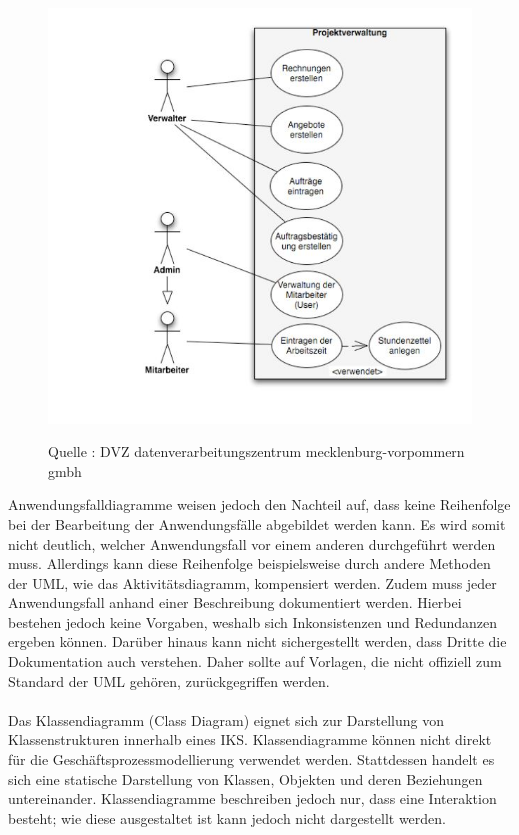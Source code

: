 \begin{center}
\begin{figure}[h]
   

\includegraphics[scale=0.8]{Graphics/Anwendungsdiagram.jpg} 



Quelle : DVZ datenverarbeitungszentrum mecklenburg-vorpommern gmbh

\label{fig2}


\end{figure}
\end{center}
\newpage
Anwendungsfalldiagramme weisen jedoch den Nachteil auf, dass keine Reihenfolge bei der Bearbeitung der Anwendungsfälle abgebildet werden kann. Es wird somit nicht deutlich, welcher Anwendungsfall vor einem anderen durchgeführt werden muss. Allerdings kann diese Reihenfolge beispielsweise durch andere Methoden der UML, wie das Aktivitätsdiagramm, kompensiert werden. Zudem muss jeder Anwendungsfall anhand einer Beschreibung dokumentiert werden. Hierbei bestehen jedoch keine Vorgaben, weshalb sich Inkonsistenzen und Redundanzen ergeben können. Darüber hinaus kann nicht sichergestellt werden, dass Dritte die Dokumentation auch verstehen. Daher sollte auf Vorlagen, die nicht offiziell zum Standard der UML gehören, zurückgegriffen werden.\\
\\
\newpage
Das Klassendiagramm (Class Diagram) eignet sich zur Darstellung von Klassenstrukturen innerhalb eines IKS. Klassendiagramme können nicht direkt für die Geschäftsprozessmodellierung verwendet werden. Stattdessen handelt es sich eine statische Darstellung von Klassen, Objekten und deren Beziehungen untereinander. Klassendiagramme beschreiben jedoch nur, dass eine Interaktion besteht; wie diese ausgestaltet ist kann jedoch nicht dargestellt werden.\\


